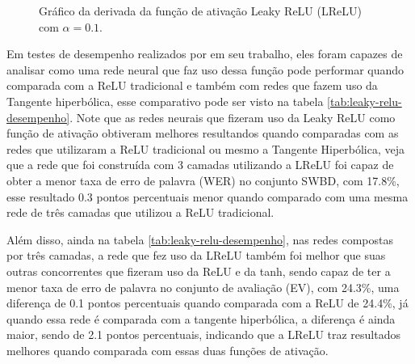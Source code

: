 \begin{figure}[h!]
    \centering
    \caption{Gráfico da derivada da função de ativação Leaky ReLU (LReLU) com $\alpha = 0.1$.}
    \label{fig:leaky-relu-derivada}
\end{figure}

Em testes de desempenho realizados por \textcite{LeakyReLUArticle} em seu trabalho, eles foram capazes de analisar como uma rede neural que faz uso dessa função pode performar quando comparada com a ReLU tradicional e também com redes que fazem uso da Tangente hiperbólica, esse comparativo pode ser visto na tabela \ref{tab:leaky-relu-desempenho}. Note que as redes neurais que fizeram uso da Leaky ReLU como função de ativação obtiveram melhores resultandos quando comparadas com as redes que utilizaram a ReLU tradicional ou mesmo a Tangente Hiperbólica, veja que a rede que foi construída com 3 camadas utilizando a LReLU foi capaz de obter a menor taxa de erro de palavra (WER) no conjunto SWBD, com 17.8\%, esse resultado 0.3 pontos percentuais menor quando comparado com uma mesma rede de três camadas que utilizou a ReLU tradicional.

Além disso, ainda na tabela \ref{tab:leaky-relu-desempenho}, nas redes compostas por três camadas, a rede que fez uso da LReLU também foi melhor que suas outras concorrentes que fizeram uso da ReLU e da tanh, sendo capaz de ter a menor taxa de erro de palavra no conjunto de avaliação (EV), com 24.3\%, uma diferença de 0.1 pontos percentuais quando comparada com a ReLU de 24.4\%, já quando essa rede é comparada com a tangente hiperbólica, a diferença é ainda maior, sendo de 2.1 pontos percentuais, indicando que a LReLU traz resultados melhores quando comparada com essas duas funções de ativação.

